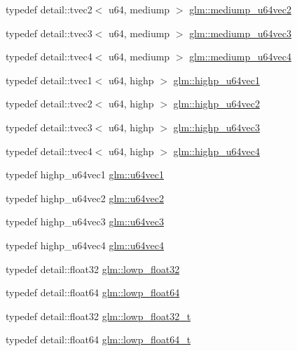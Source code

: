 \begin{CompactItemize}
\item 
typedef detail::tvec2$<$ u64, mediump $>$ \hyperlink{group__gtc__type__precision_g9eda8d6f5be7a2919fb90412535b385f}{glm::mediump\_\-u64vec2}
\item 
typedef detail::tvec3$<$ u64, mediump $>$ \hyperlink{group__gtc__type__precision_g7af0601e6a8ce71bd21ecf67971f5154}{glm::mediump\_\-u64vec3}
\item 
typedef detail::tvec4$<$ u64, mediump $>$ \hyperlink{group__gtc__type__precision_ge25a6609fa377ba1ec983ec32a91f1d4}{glm::mediump\_\-u64vec4}
\item 
typedef detail::tvec1$<$ u64, highp $>$ \hyperlink{group__gtc__type__precision_gb48ca217e1d1cc9aac3d9f037493ae7e}{glm::highp\_\-u64vec1}
\item 
typedef detail::tvec2$<$ u64, highp $>$ \hyperlink{group__gtc__type__precision_gd11667a4764867732a89791ec2a01aeb}{glm::highp\_\-u64vec2}
\item 
typedef detail::tvec3$<$ u64, highp $>$ \hyperlink{group__gtc__type__precision_g3cb5c038f8cba0dfb894af66b7b2ba13}{glm::highp\_\-u64vec3}
\item 
typedef detail::tvec4$<$ u64, highp $>$ \hyperlink{group__gtc__type__precision_g8aa6fc9f16dfa3078d411f6361188a45}{glm::highp\_\-u64vec4}
\item 
typedef highp\_\-u64vec1 \hyperlink{group__gtc__type__precision_g7d5145019ad749f4becd39ce8e786a5f}{glm::u64vec1}
\item 
typedef highp\_\-u64vec2 \hyperlink{group__gtc__type__precision_gffa78d655fd98b33e47043e2bd38641b}{glm::u64vec2}
\item 
typedef highp\_\-u64vec3 \hyperlink{group__gtc__type__precision_ge934e74663d832989066cc852560866d}{glm::u64vec3}
\item 
typedef highp\_\-u64vec4 \hyperlink{group__gtc__type__precision_g59d78a1ff6d275bbb425dce92f607b9c}{glm::u64vec4}
\item 
typedef detail::float32 \hyperlink{group__gtc__type__precision_g92be8087f3c84504f3a44af1a9efc51e}{glm::lowp\_\-float32}
\item 
typedef detail::float64 \hyperlink{group__gtc__type__precision_g32e02689f4e83fb269c9047418536f2c}{glm::lowp\_\-float64}
\item 
typedef detail::float32 \hyperlink{group__gtc__type__precision_gdfb453b23cb820e3e4e766e047c67dab}{glm::lowp\_\-float32\_\-t}
\item 
typedef detail::float64 \hyperlink{group__gtc__type__precision_gc9d64f4e69d6c2eade41a848077866b5}{glm::lowp\_\-float64\_\-t}

\end{CompactItemize}
